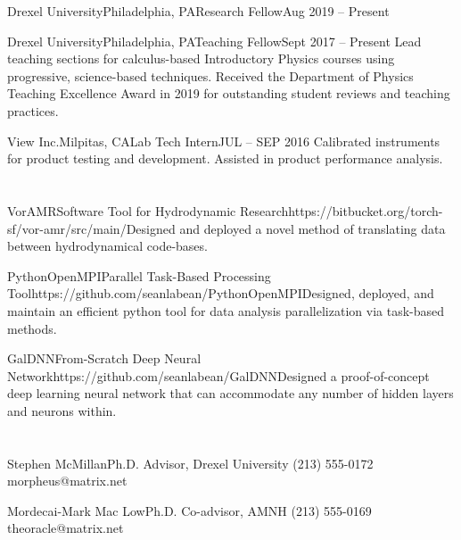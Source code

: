 \documentclass{resume}
\begin{document}
\begin{job}{Drexel University}{Philadelphia, PA}{Research Fellow}{Aug 2019 -- Present}
	\bullet 
\end{job}

\begin{job}{Drexel University}{Philadelphia, PA}{Teaching Fellow}{Sept 2017 -- Present}
	\bullet Lead teaching sections for calculus-based Introductory Physics courses using progressive, science-based techniques.
	\bullet Received the Department of Physics Teaching Excellence Award in 2019 for outstanding student reviews and teaching practices.
\end{job}

\begin{job}{View Inc.}{Milpitas, CA}{Lab Tech Intern}{JUL -- SEP 2016}
	\bullet Calibrated instruments for product testing and development. Assisted in product performance analysis.
\end{job}

\section*{}

\begin{project}{VorAMR}{Software Tool for Hydrodynamic Research}{https://bitbucket.org/torch-sf/vor-amr/src/main/}{Designed and deployed a novel method of translating data between hydrodynamical code-bases. }
\end{project}

\begin{project}{PythonOpenMPI}{Parallel Task-Based Processing Tool}{https://github.com/seanlabean/PythonOpenMPI}{Designed, deployed, and maintain an efficient python tool for data analysis parallelization via task-based methods.}
\end{project}

\begin{project}{GalDNN}{From-Scratch Deep Neural Network}{https://github.com/seanlabean/GalDNN}{Designed a proof-of-concept deep learning neural network that can accommodate any number of hidden layers and neurons within.}
\end{project}

\section*{}

\section*{}

\begin{reference}{Stephen McMillan}{Ph.D. Advisor, Drexel University}
	(213) 555-0172\\
	morpheus@matrix.net
\end{reference}

\begin{reference}{Mordecai-Mark Mac Low}{Ph.D. Co-advisor, AMNH}
	(213) 555-0169\\
	theoracle@matrix.net
\end{reference}
\end{document}
